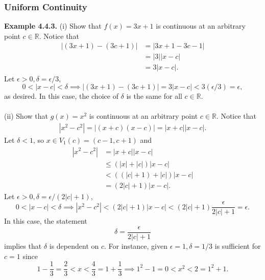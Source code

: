 \documentclass{article}
\begin{document}
            \subsubsection{Uniform Continuity}
            \textbf{Example 4.4.3.} (i) Show that $f(x) = 3x + 1$ is continuous at an arbitrary point $c \in \mathbb{R}$. Notice that
            \begin{align*}
                |(3x+1)-(3c+1)| &= |3x+1-3c-1| \\
                & = |3||x-c| \\
                & = 3|x-c|.
            \end{align*}
            Let $\epsilon >0, \delta = \epsilon/3$,
            \begin{equation*}
                0<|x-c|<\delta \implies |(3x+1)-(3c+1)| = 3|x-c| < 3(\epsilon/3) = \epsilon,
            \end{equation*}
            as desired. In this case, the choice of $\delta$ is the same for all $c \in \mathbb{R}$.
            \\ \\
            (ii) Show that $g(x)=x^2$ is continuous at an arbitrary point $c \in \mathbb{R}$. Notice that
            \begin{align*}
                |x^2 - c^2| = |(x+c)(x-c)| = |x+c||x-c|.
            \end{align*}
            Let $\delta < 1$, so $x \in V_1(c) = (c-1,c+1)$ and
            \begin{align*}
                |x^2-c^2| &= |x+c||x-c| \\
                &\leq (|x|+|c|)|x-c| \\
                &< ((|c|+1)+|c|)|x-c| \\
                & = (2|c|+1)|x-c|.
            \end{align*}
            Let $\epsilon >0, \delta = \epsilon/(2|c|+1)$,
            \begin{equation*}
                0<|x-c|<\delta \implies |x^2-c^2| < (2|c|+1)|x-c| < (2|c|+1)\frac{\epsilon}{2|c|+1} = \epsilon.
            \end{equation*}
            In this case, the statement
            \begin{equation*}
                \delta = \frac{\epsilon}{2|c|+1} 
            \end{equation*}
            implies that $\delta$ is dependent on $c$. For instance, given $\epsilon=1, \delta=1/3$ is sufficient for $c=1$ since
            \begin{equation*}
                1-\frac{1}{3}=\frac{2}{3}<x<\frac{4}{3}=1+\frac{1}{3} \implies 1^2-1=0<x^2<2=1^2+1.
            \end{equation*}
\end{document}
